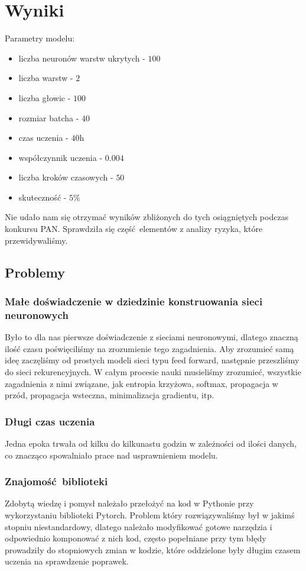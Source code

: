 \newpage
\section{Wyniki}

Parametry modelu:
\begin{itemize}
	  \item liczba neuronów warstw ukrytych - $100$
	  \item liczba warstw - $2$
	  \item liczba głowic - $100$
	  \item rozmiar batcha - $40$
	  \item czas uczenia - $40$h
	  \item współczynnik uczenia - $0.004$
	  \item liczba kroków czasowych - $50$
	  \item skuteczność - $5\%$
	\end{itemize}
	
Nie udało nam się otrzymać wyników zbliżonych do tych osiągniętych podczas konkursu PAN. Sprawdziła się
część elementów z analizy ryzyka, które przewidywaliśmy.

\subsection{Problemy}
\subsubsection{Małe doświadczenie w dziedzinie konstruowania sieci neuronowych}
Było to dla nas pierwsze doświadczenie z sieciami neuronowymi, dlatego znaczną ilość czasu poświęciliśmy na 
zrozumienie tego zagadnienia. Aby zrozumieć samą ideę zaczęliśmy od prostych modeli sieci typu feed forward,
następnie przeszliśmy do sieci rekurencyjnych. W całym procesie nauki musieliśmy zrozumieć,
wszystkie zagadnienia z nimi związane, jak entropia krzyżowa, softmax, propagacja w przód, propagacja wsteczna, 
minimalizacja gradientu, itp.
 
\subsubsection{Długi czas uczenia}
Jedna epoka trwała od kilku do kilkunastu godzin w zależności od ilości danych, co znacząco spowalniało 
prace nad usprawnieniem modelu. 
 
\subsubsection{Znajomość biblioteki}
Zdobytą wiedzę i pomysł należało przełożyć na kod w Pythonie przy wykorzystaniu biblioteki Pytorch. 
Problem który rozwiązywaliśmy był w jakimś stopniu niestandardowy, dlatego należało modyfikować 
gotowe narzędzia i odpowiednio komponować z nich kod, często popełniane przy tym błędy prowadziły 
do stopniowych zmian w kodzie, które oddzielone były długim czasem uczenia na sprawdzenie poprawek.

